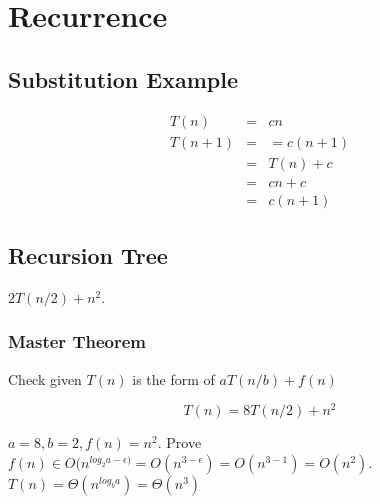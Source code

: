 \documentclass{article}
\begin{document}
\setcounter{section}{3}
\section{Recurrence}
\subsection*{Substitution Example}
\begin{eqnarray}
T(n) & = & cn \\
T(n+1) & = & = c(n + 1) \\
& = & T(n) + c \\
& = & cn + c \\
& = & c(n + 1)
\end{eqnarray}

\subsection*{Recursion Tree}
$2T(n/2) + n^2$.

\noindent\makebox[\textwidth]{\texttt{[image: 1]}}

\subsubsection*{Master Theorem}
Check given $T(n)$ is the form of $aT(n/b) + f(n)$

\begin{equation}
T(n) = 8 T (n/2) + n^2
\end{equation}

$a = 8, b = 2, f(n) = n^2$. Prove $f(n) \in O(n^{log _2 a- \epsilon)} = O(n^{3- \epsilon}) = O(n^{3 - 1}) = O(n^2)$. $T(n) = \Theta (n^{log _b a}) = \Theta (n^3)$
\end{document}
